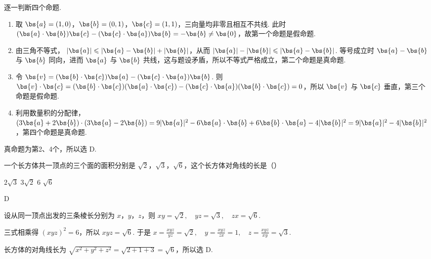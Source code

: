 \begin{solution}
逐一判断四个命题.

\begin{enumerate}
\item 取 \(\bs{a}=(1,0)\)，\(\bs{b}=(0,1)\)，\(\bs{c}=(1,1)\)，三向量均非零且相互不共线. 此时
\(
(\bs{a}\cdot\bs{b})\bs{c}-(\bs{c}\cdot\bs{a})\bs{b}=-\bs{b}\ne\bs{0}
 \)，故第一个命题是假命题.

\item 由三角不等式，
\(
|\bs{a}|\leqslant|\bs{a}-\bs{b}|+|\bs{b}|
 \)，从而 \(|\bs{a}|-|\bs{b}|\leqslant|\bs{a}-\bs{b}|\). 等号成立时 \(\bs{a}-\bs{b}\) 与 \(\bs{b}\) 同向，进而 \(\bs{a}\) 与 \(\bs{b}\) 共线，这与题设矛盾，所以不等式严格成立，第二个命题是真命题.

\item 令 \(\bs{v}=(\bs{b}\cdot\bs{c})\bs{a}-(\bs{c}\cdot\bs{a})\bs{b}\). 则
\(
\bs{v}\cdot\bs{c}=(\bs{b}\cdot\bs{c})(\bs{a}\cdot\bs{c})-(\bs{c}\cdot\bs{a})(\bs{b}\cdot\bs{c})=0
 \)，所以 \(\bs{v}\) 与 \(\bs{c}\) 垂直，第三个命题是假命题.

\item 利用数量积的分配律，
\(
(3\bs{a}+2\bs{b})\cdot(3\bs{a}-2\bs{b})=9|\bs{a}|^{2}-6\bs{a}\cdot\bs{b}+6\bs{b}\cdot\bs{a}-4|\bs{b}|^{2}=9|\bs{a}|^{2}-4|\bs{b}|^{2}
 \)，第四个命题是真命题.
\end{enumerate}

真命题为第2、4个，所以选 D.
\end{solution}

\begin{problem}
一个长方体共一顶点的三个面的面积分别是 \(\sqrt{2}\)，\(\sqrt{3}\)，\(\sqrt{6}\)，这个长方体对角线的长是（\quad）

\choices
    {\(2 \sqrt{3}\)}
    {\(3\sqrt{2}\)}
    {\(6\)}
    {\(\sqrt{6}\)}
\end{problem}

\begin{answer}
D
\end{answer}

\begin{solution}
设从同一顶点出发的三条棱长分别为 \(x\)，\(y\)，\(z\)，则
\(
xy=\sqrt{2},\quad yz=\sqrt{3},\quad zx=\sqrt{6}
\).

三式相乘得 \((xyz)^{2}=6\)，所以 \(xyz=\sqrt{6}\). 于是
\(
x=\frac{xyz}{yz}=\sqrt{2},\quad y=\frac{xyz}{zx}=1,\quad z=\frac{xyz}{xy}=\sqrt{3}
\).

长方体的对角线长为
\(
\sqrt{x^{2}+y^{2}+z^{2}}=\sqrt{2+1+3}=\sqrt{6}
\)，所以选 D.
\end{solution}

